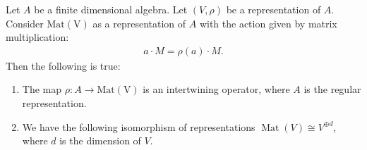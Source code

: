 \begin{lemma}
    Let $A$ be a finite dimensional algebra. Let $(V, \rho)$ be a representation of $A$. Consider $\operatorname{Mat(V)}$ as a representation of $A$ with the action given by matrix multiplication:
    \begin{align*}
        a \cdot M = \rho(a) \cdot M.
    \end{align*} 
    Then the following is true:
    \begin{enumerate}
        \item The map $\rho: A \to \operatorname{Mat(V)}$ is an intertwining operator, where $A$ is the regular representation.
        \item We have the following isomorphism of representations $\operatorname{Mat}(V) \cong V^{\oplus d}$, where $d$ is the dimension of $V$.
    \end{enumerate}
\end{lemma}

